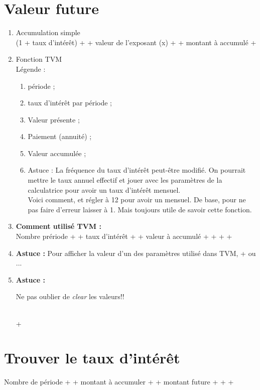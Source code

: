 \documentclass[11pt,french]{report}
\begin{document}
\section{Valeur future}
\begin{enumerate}

\item Accumulation simple
\\ (1 + taux d'intérêt) +  + valeur de l'exposant (x) +  + montant à accumulé + \fbox{=}
\item Fonction TVM
\\ Légende :

\begin{enumerate}
\item {} période ;
\item {} taux d'intérêt par période ;
\item {} Valeur présente ;
\item {} Paiement (annuité) ;
\item {} Valeur accumulée ;
\item Astuce : La fréquence du taux d'intérêt peut-être modifié. On pourrait mettre le taux annuel effectif et jouer avec les paramètres de la calculatrice pour avoir un taux d'intérêt mensuel.
\\ Voici comment,  et régler à 12 pour avoir un mensuel. De base, pour ne pas faire d'erreur laisser à 1. Mais toujours utile de savoir cette fonction.
\end{enumerate}

\item \textbf{Comment utilisé TVM :}
\\ Nombre prériode +  + taux d'intérêt +  + valeur à accumulé + \fbox{+$ / $-} +  +  + 
\\ 
\item \textbf{Astuce :} Pour afficher la valeur d'un des paramètres utilisé dans TVM,  +  ou ... 
\\
\item \textbf{Astuce :}
\begin{LARGE}
Ne pas oublier de \textit{clear} les valeurs!!
\end{LARGE}
\\  + 

\end{enumerate}

\section{Trouver le taux d'intérêt}
Nombre de période +  + montant à accumuler +  + montant future +  +  + 
\end{document}
